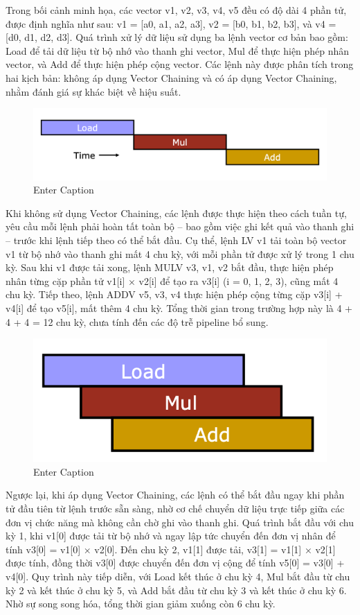 \documentclass[a4paper]{article}
\begin{document}
Trong bối cảnh minh họa, các vector v1, v2, v3, v4, v5 đều có độ dài 4 phần tử, được định nghĩa như sau: v1 = [a0, a1, a2, a3], v2 = [b0, b1, b2, b3], và v4 = [d0, d1, d2, d3]. Quá trình xử lý dữ liệu sử dụng ba lệnh vector cơ bản bao gồm: Load để tải dữ liệu từ bộ nhớ vào thanh ghi vector, Mul để thực hiện phép nhân vector, và Add để thực hiện phép cộng vector. Các lệnh này được phân tích trong hai kịch bản: không áp dụng Vector Chaining và có áp dụng Vector Chaining, nhằm đánh giá sự khác biệt về hiệu suất.
\begin{figure}[H]
    \centering
    \includegraphics[width=0.6\linewidth]{assets/vector-chain-1.png}
    \caption{Enter Caption}
    \label{fig:enter-label}
\end{figure}
Khi không sử dụng Vector Chaining, các lệnh được thực hiện theo cách tuần tự, yêu cầu mỗi lệnh phải hoàn tất toàn bộ – bao gồm việc ghi kết quả vào thanh ghi – trước khi lệnh tiếp theo có thể bắt đầu. Cụ thể, lệnh LV v1 tải toàn bộ vector v1 từ bộ nhớ vào thanh ghi mất 4 chu kỳ, với mỗi phần tử được xử lý trong 1 chu kỳ. Sau khi v1 được tải xong, lệnh MULV v3, v1, v2 bắt đầu, thực hiện phép nhân từng cặp phần tử v1[i] × v2[i] để tạo ra v3[i] (i = 0, 1, 2, 3), cũng mất 4 chu kỳ. Tiếp theo, lệnh ADDV v5, v3, v4 thực hiện phép cộng từng cặp v3[i] + v4[i] để tạo v5[i], mất thêm 4 chu kỳ. Tổng thời gian trong trường hợp này là 4 + 4 + 4 = 12 chu kỳ, chưa tính đến các độ trễ pipeline bổ sung.
\begin{figure}[H]
    \centering
    \includegraphics[width=0.5\linewidth]{assets/vector-chain-2.png}
    \caption{Enter Caption}
    \label{fig:enter-label}
\end{figure}
Ngược lại, khi áp dụng Vector Chaining, các lệnh có thể bắt đầu ngay khi phần tử đầu tiên từ lệnh trước sẵn sàng, nhờ cơ chế chuyển dữ liệu trực tiếp giữa các đơn vị chức năng mà không cần chờ ghi vào thanh ghi. Quá trình bắt đầu với chu kỳ 1, khi v1[0] được tải từ bộ nhớ và ngay lập tức chuyển đến đơn vị nhân để tính v3[0] = v1[0] × v2[0]. Đến chu kỳ 2, v1[1] được tải, v3[1] = v1[1] × v2[1] được tính, đồng thời v3[0] được chuyển đến đơn vị cộng để tính v5[0] = v3[0] + v4[0]. Quy trình này tiếp diễn, với Load kết thúc ở chu kỳ 4, Mul bắt đầu từ chu kỳ 2 và kết thúc ở chu kỳ 5, và Add bắt đầu từ chu kỳ 3 và kết thúc ở chu kỳ 6. Nhờ sự song song hóa, tổng thời gian giảm xuống còn 6 chu kỳ.
\end{document}

